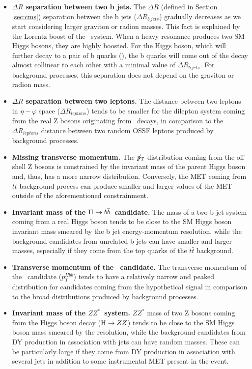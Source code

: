 \begin{itemize}

\item{\bfseries $\Delta R$ separation between two b jets.}
The $\Delta R$ (defined in Section \ref{sec:cms}) separation between the b jets ($\Delta R_{b\ jets}$) gradually decreases as we start considering larger graviton or radion masses. This fact is explained by the Lorentz boost of the \HBB~system. When a heavy resonance produces two SM Higgs bosons, they are highly boosted. For the Higgs boson, which will further decay to a pair of b quarks (\HBB), the b quarks will come out of the decay almost collinear to each other with a minimal value of $\Delta R_{b\ jets}$. For background processes, this separation does not depend on the graviton or radion mass. 

\item{\bfseries $\Delta R$ separation between two leptons.}
The distance between two leptons in $\eta - \varphi$ space ($\Delta R_{leptons}$) tends to be smaller for the dilepton system coming from the real Z bosons originating from \HZZ~decays, in comparison to the $\Delta R_{leptons}$ distance between two random OSSF leptons produced by background processes. 

\item{\bfseries Missing transverse momentum.}
The ${p}_\mathrm{T}\hspace{-1.02em}/\kern 0.5em$ distribution coming from the off-shell Z bosons is constrained by the invariant mass of the parent Higgs boson and, thus, has a more narrow distribution. Conversely, the MET coming from $t\bar{t}$ background process can produce smaller and larger values of the MET outside of the aforementioned constrainment. 

\item{\bfseries Invariant mass of the $\mathrm{H}\to b\bar{b}$~candidate.} 
The mass of a two b jet system coming from a real Higgs boson tends to be close to the SM Higgs boson invariant mass smeared by the b jet energy-momentum resolution, while the background candidates from unrelated b jets can have smaller and larger masses, especially if they come from the top quarks of the $t\bar{t}$ background.

\item{\bfseries Transverse momentum of the \HBB~candidate.} 
The transverse momentum of the \HBB~candidate ($p_T^{Hbb}$) tends to have a relatively narrow and peaked distribution for candidates coming from the hypothetical signal in comparison to the broad distributions produced by background processes. 

\item{\bfseries Invariant mass of the $ZZ^*$~system.} 
$ZZ^*$ mass of two Z bosons coming from the Higgs boson decay ($\mathrm{H}\rightarrow ZZ$) tends to be close to the SM Higgs boson mass smeared by the \PTslash resolution, while the background candidates from DY production in association with jets can have random masses. These can be particularly large if they come from DY production in association with several jets in addition to some instrumental MET present in the event.


\end{itemize}
